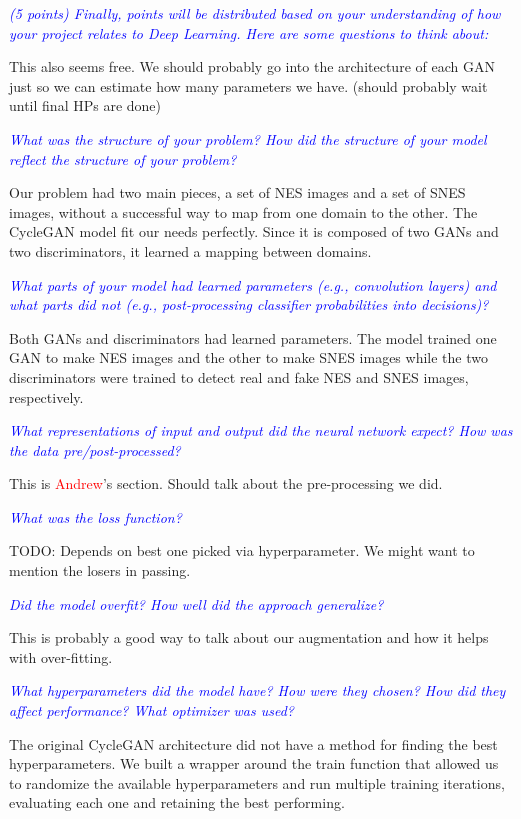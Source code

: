 \documentclass[10pt,twocolumn,letterpaper]{article}
\begin{document}
\textit{\textcolor{blue}{(5 points) Finally, points will be distributed based on your understanding of how your project relates to Deep Learning. Here are some questions to think about:}}

This also seems free. We should probably go into the architecture of each GAN just so we can estimate how many parameters we have. (should probably wait until final HPs are done)

\textit{\textcolor{blue}{What was the structure of your problem? How did the structure of your model reflect the structure of your problem?}}

Our problem had two main pieces, a set of NES images and a set of SNES images, without a successful way to map from one domain to the other. The CycleGAN model fit our needs perfectly. Since it is composed of two GANs and two discriminators, it learned a mapping between domains.

\textit{\textcolor{blue}{What parts of your model had learned parameters (e.g., convolution layers) and what parts did not (e.g., post-processing classifier probabilities into decisions)? }}

Both GANs and discriminators had learned parameters. The model trained one GAN to make NES images and the other to make SNES images while the two discriminators were trained to detect real and fake NES and SNES images, respectively.

\textit{\textcolor{blue}{What representations of input and output did the neural network expect? How was the data pre/post-processed?}}

This is \textcolor{red}{Andrew}'s section. Should talk about the pre-processing we did.

\textit{\textcolor{blue}{What was the loss function?}}

TODO: Depends on best one picked via hyperparameter. We might want to mention the losers in passing.

\textit{\textcolor{blue}{Did the model overfit? How well did the approach generalize?}}

This is probably a good way to talk about our augmentation and how it helps with over-fitting.

\textit{\textcolor{blue}{What hyperparameters did the model have? How were they chosen? How did they affect performance? What optimizer was used?}}

The original CycleGAN architecture did not have a method for finding the best hyperparameters. We built a wrapper around the train function that allowed us to randomize the available hyperparameters and run multiple training iterations, evaluating each one and retaining the best performing.
\end{document}
